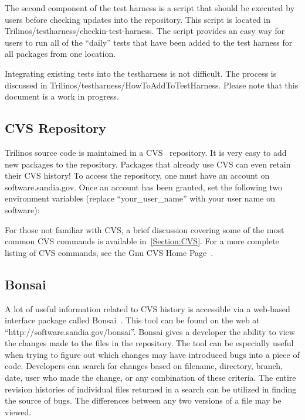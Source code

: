 \documentclass[12pt,relax]{TrilinosDevGuide}
\begin{document}
The second component of the test harness is a script that should be executed 
by users before checking updates into the repository.  This script is located 
in Trilinos/testharness/checkin-test-harness.  The script provides an easy way 
for users to run all of the ``daily'' tests that have been added to the test 
harness for all packages from one location.  

Integrating existing tests into the testharness is not difficult.  
The process is discussed in Trilinos/testharness/HowToAddToTestHarness.  
Please note that this document is a work in progress.

\subsection{CVS Repository}

Trilinos source code is maintained in a CVS~\cite{CVS} repository.  It is 
very easy to add new packages to the repository.  Packages that already use 
CVS can even retain their CVS history!  To access the repository, one must 
have an account on software.sandia.gov.  Once an account has been granted, 
set the following two environment variables (replace ``your\_user\_name'' 
with your user name on software):


For those not familiar with CVS, a brief discussion covering some of the most 
common CVS commands is available in~\ref{Section:CVS}.  For a more complete 
listing of CVS commands, see the Gnu CVS Home Page~\cite{CVS}.

\subsection{Bonsai}
A lot of useful information related to CVS history is accessible via a
web-based interface package called Bonsai~\cite{Bonsai}.  This tool can be 
found on the web at ``http://software.sandia.gov/bonsai''.  Bonsai gives a 
developer the ability to view the changes made to the files in the 
repository.  The tool can be especially useful when trying to figure out which 
changes may have introduced bugs into a piece of code.  Developers can search 
for changes based on filename, directory, branch, date, user who made the 
change, or any combination of these criteria.  The entire revision histories of
individual files returned in a search can be utilized in finding the source of 
bugs.  The differences between any two versions of a file may be viewed.  
\end{document}
